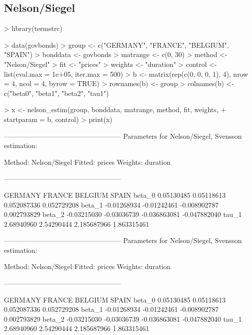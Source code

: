 \subsection{Nelson/Siegel}

\begin{Schunk}
\begin{Sinput}
> library(termstrc)
\end{Sinput}
\end{Schunk}

\begin{Schunk}
\begin{Sinput}
> data(govbonds)
> group <- c("GERMANY", "FRANCE", "BELGIUM", "SPAIN")
> bonddata <- govbonds
> matrange <- c(0, 30)
> method <- "Nelson/Siegel"
> fit <- "prices"
> weights <- "duration"
> control <- list(eval.max = 1e+05, iter.max = 500)
> b <- matrix(rep(c(0, 0, 0, 1), 4), nrow = 4, ncol = 4, byrow = TRUE)
> rownames(b) <- group
> colnames(b) <- c("beta0", "beta1", "beta2", "tau1")
\end{Sinput}
\end{Schunk}

\begin{Schunk}
\begin{Sinput}
> x <- nelson_estim(group, bonddata, matrange, method, fit, weights, 
+     startparam = b, control)
> print(x)
\end{Sinput}
\begin{Soutput}
---------------------------------------------------
Parameters for Nelson/Siegel, Svensson estimation:

Method: Nelson/Siegel 
Fitted: prices 
Weights: duration 

---------------------------------------------------

           GERMANY      FRANCE      BELGIUM        SPAIN
beta_0  0.05130485  0.05118613  0.052087336  0.052729208
beta_1 -0.01268934 -0.01242461 -0.008902787  0.002793829
beta_2 -0.03215030 -0.03036739 -0.036863081 -0.047882040
tau_1   2.68940960  2.54290444  2.185687966  1.863315461

---------------------------------------------------
Parameters for Nelson/Siegel, Svensson estimation:

Method: Nelson/Siegel 
Fitted: prices 
Weights: duration 

---------------------------------------------------

           GERMANY      FRANCE      BELGIUM        SPAIN
beta_0  0.05130485  0.05118613  0.052087336  0.052729208
beta_1 -0.01268934 -0.01242461 -0.008902787  0.002793829
beta_2 -0.03215030 -0.03036739 -0.036863081 -0.047882040
tau_1   2.68940960  2.54290444  2.185687966  1.863315461
\end{Soutput}
\end{Schunk}

